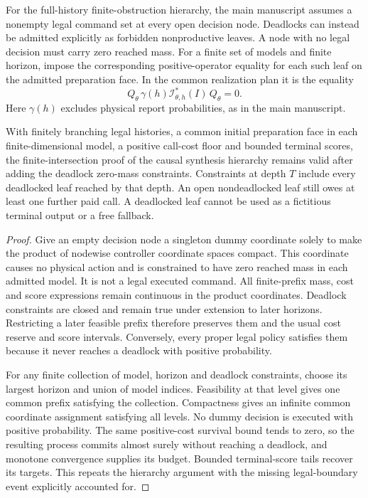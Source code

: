 For the full-history finite-obstruction hierarchy, the main manuscript assumes a nonempty legal command set at every open decision node. Deadlocks can instead be admitted explicitly as forbidden nonproductive leaves. A node with no legal decision must carry zero reached mass. For a finite set of models and finite horizon, impose the corresponding positive-operator equality for each such leaf on the admitted preparation face. In the common realization plan it is the equality
\[
 Q_\theta\,\gamma(h)\mathcal I_{\theta,h}^*(I)\,Q_\theta=0.
\]
Here $\gamma(h)$ excludes physical report probabilities, as in the main manuscript.
\begin{proposition}\label{prop:deadlock}
With finitely branching legal histories, a common initial preparation face in each finite-dimensional model, a positive call-cost floor and bounded terminal scores, the finite-intersection proof of the causal synthesis hierarchy remains valid after adding the deadlock zero-mass constraints. Constraints at depth $T$ include every deadlocked leaf reached by that depth. An open nondeadlocked leaf still owes at least one further paid call. A deadlocked leaf cannot be used as a fictitious terminal output or a free fallback.
\end{proposition}
\begin{proof}
Give an empty decision node a singleton dummy coordinate solely to make the product of nodewise controller coordinate spaces compact. This coordinate causes no physical action and is constrained to have zero reached mass in each admitted model. It is not a legal executed command. All finite-prefix mass, cost and score expressions remain continuous in the product coordinates. Deadlock constraints are closed and remain true under extension to later horizons. Restricting a later feasible prefix therefore preserves them and the usual cost reserve and score intervals. Conversely, every proper legal policy satisfies them because it never reaches a deadlock with positive probability.

For any finite collection of model, horizon and deadlock constraints, choose its largest horizon and union of model indices. Feasibility at that level gives one common prefix satisfying the collection. Compactness gives an infinite common coordinate assignment satisfying all levels. No dummy decision is executed with positive probability. The same positive-cost survival bound tends to zero, so the resulting process commits almost surely without reaching a deadlock, and monotone convergence supplies its budget. Bounded terminal-score tails recover its targets. This repeats the hierarchy argument with the missing legal-boundary event explicitly accounted for.
\end{proof}

